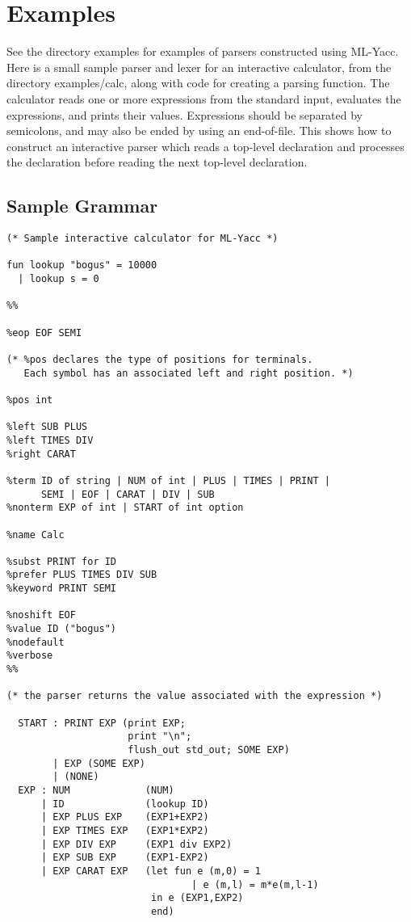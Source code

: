 \section{Examples}

See the directory examples for examples of parsers constructed using
ML-Yacc.  Here is a small sample parser and lexer for an interactive
calculator, from the directory examples/calc, along with code for
creating a parsing function.  The calculator reads one or more
expressions from the standard input, evaluates the expressions, and
prints their values.  Expressions should be separated by semicolons,
and may also be ended by using an end-of-file.  This shows how to
construct an interactive parser which reads a top-level declaration
and processes the declaration before reading the next top-level
declaration.

\subsection{Sample Grammar}
\begin{tt}
\begin{verbatim}
(* Sample interactive calculator for ML-Yacc *)

fun lookup "bogus" = 10000
  | lookup s = 0

%%

%eop EOF SEMI

(* %pos declares the type of positions for terminals.
   Each symbol has an associated left and right position. *)

%pos int

%left SUB PLUS
%left TIMES DIV
%right CARAT

%term ID of string | NUM of int | PLUS | TIMES | PRINT |
      SEMI | EOF | CARAT | DIV | SUB
%nonterm EXP of int | START of int option

%name Calc

%subst PRINT for ID
%prefer PLUS TIMES DIV SUB
%keyword PRINT SEMI

%noshift EOF
%value ID ("bogus")
%nodefault
%verbose
%%

(* the parser returns the value associated with the expression *)

  START : PRINT EXP (print EXP;
                     print "\n";
                     flush_out std_out; SOME EXP)
        | EXP (SOME EXP)
        | (NONE)
  EXP : NUM             (NUM)
      | ID              (lookup ID)
      | EXP PLUS EXP    (EXP1+EXP2)
      | EXP TIMES EXP   (EXP1*EXP2)
      | EXP DIV EXP     (EXP1 div EXP2)
      | EXP SUB EXP     (EXP1-EXP2)
      | EXP CARAT EXP   (let fun e (m,0) = 1
                                | e (m,l) = m*e(m,l-1)
                         in e (EXP1,EXP2)       
                         end)
\end{verbatim}
\end{tt}
